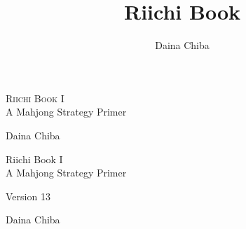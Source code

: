 \documentclass{book}
\title{Riichi Book}
\author{Daina Chiba}
\newcommand{\theversion}{13}
\begin{document}
\frontmatter
{}

\thispagestyle{empty}


\begin{flushleft}

\vspace*{.24\paperheight}

\begin{spacing}{2.5}
\vspace{3.25cm}
{\fontsize{2.0cm}{3.6em}\scshape Riichi Book I}\\
{\LARGE A Mahjong Strategy Primer}
\end{spacing}

\vspace*{.08\paperheight}
\hfill {\LARGE Daina Chiba}

\end{flushleft}

\restoregeometry


\thispagestyle{empty}
\mbox{}\newpage
\thispagestyle{empty}
\mbox{}\newpage

\thispagestyle{empty}
\setcounter{page}{1}
\pagebreak
\onehalfspacing

\begin{flushright}

\vspace*{.18\paperheight}

\begin{spacing}{3}
{\Huge Riichi Book I}\\
{\Large A Mahjong Strategy Primer}
\end{spacing}

\vspace*{.11\textheight} 

{\Large Version \theversion}\\

\vspace*{.03\textheight} 

{\Large
Daina Chiba\\
}

\vfill

\end{flushright}

\pagebreak
\end{document}
